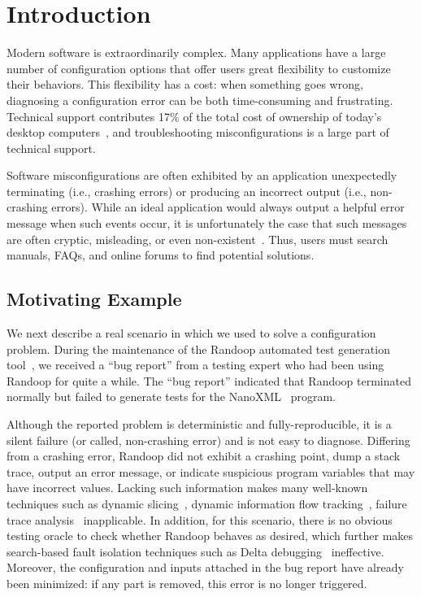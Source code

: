 
\section{Introduction}
\label{sec:introduction}

Modern software is extraordinarily complex. Many applications have a large
number of configuration options that offer users great flexibility to
customize their behaviors. This flexibility has a cost: when something
goes wrong, diagnosing a configuration error can be both time-consuming
and frustrating. Technical support contributes 17\% of the total cost of ownership of
today's desktop computers~\cite{confevidence}, and troubleshooting misconfigurations
is a large part of technical support.

Software misconfigurations are often exhibited by an application unexpectedly terminating
(i.e., crashing errors) or producing an incorrect output (i.e., non-crashing errors). While an ideal application would always
output a helpful error message when such events occur, it is unfortunately
the case that such messages are often cryptic, misleading, or
even non-existent~\cite{Yin:2011:ESC, Attariyan:2010:ACT, Hubaux:2012, rangefix}.
Thus, users must search manuals, FAQs, and online forums to find potential
solutions.%

\subsection{Motivating Example}
\label{sec:mot}

We next describe a real scenario in which we used \ourtool to solve a configuration problem. 
During the maintenance of the Randoop
automated test generation tool~\cite{randoop}, we received a ``bug report''
from a testing expert who had been using Randoop for quite a while.
The ``bug report'' indicated that Randoop terminated normally but
failed to generate tests for the NanoXML~\cite{nanoxml} program. 

Although the reported problem is deterministic and fully-reproducible,
it is a silent failure (or called, non-crashing error) and is
not easy to diagnose. Differing from
a crashing error, Randoop did not exhibit a crashing point, dump
 a stack trace, output an error message, or indicate suspicious program
variables that may have incorrect values. Lacking such information
makes many well-known
techniques such as dynamic slicing~\cite{Zhang:2003:PDS},
dynamic information flow tracking~\cite{Attariyan:2010:ACT},
failure trace analysis~\cite{Rabkin:2011:PPC} inapplicable.
In addition, for this scenario, there is no obvious testing oracle to check whether
Randoop behaves as desired, which further makes 
search-based fault isolation techniques such as Delta debugging~\cite{Zeller:2002:ICC}
ineffective. Moreover, the configuration and
inputs attached in the bug report have already been
minimized: if any part is removed, this error
is no longer triggered. 


